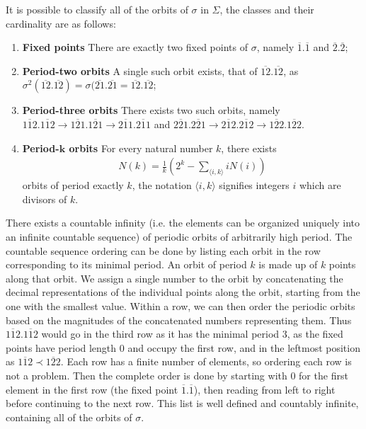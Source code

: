 It is possible to classify all of the orbits of $\sigma $ in $\Sigma$, the classes and their cardinality are as follows:
\begin{enumerate}
	\item \textbf{Fixed points} There are exactly two fixed points of $\sigma$, namely $\overline{1}\bm{.} \overline{1}$ and $\overline{2}\bm{.} \overline{2}$; 
	\item \textbf{Period-two orbits} A single such orbit exists, that of $\overline{12}\bm{.} \overline{12}$, as $\sigma^{2}(\overline{12}\bm{.} \overline{12}) = \sigma(\overline{21}\bm{.} \overline{21} = \overline{12}\bm{.} \overline{12}$;
	\item \textbf{Period-three orbits} There exists two such orbits, namely $\overline{112}\bm{.} \overline{112} \to \overline{121}\bm{.} \overline{121} \to \overline{211}\bm{.} \overline{211}$ and $\overline{221} \bm{.} \overline{221} \to \overline{212}\bm{.} \overline{212} \to \overline{122}\bm{.} \overline{122} $.
	\item \textbf{Period-$\bm{k} $ orbits} For every natural number $k$, there exists 
		\begin{align}
			\boxed{N(k) = \frac{1}{k}\left(2^k - \sum_{\langle i,k \rangle }^{} i N(i)\right)}		
		\end{align}
		orbits of period exactly $k$, the notation $\langle i,k\rangle$ signifies integers $i$ which are divisors of $k$.	
\end{enumerate}
There exists a countable infinity (i.e. the elements can be organized uniquely into an infinite countable sequence) of periodic orbits of arbitrarily high period. The countable sequence ordering can be done by listing each orbit in the row corresponding to its minimal period. An orbit of period $k$  is made up of $k$ points along that orbit. We assign a single number to the orbit by concatenating the decimal representations of the individual points along the orbit, starting from the one with the smallest value. Within a row, we can then order the periodic orbits based on the magnitudes of the concatenated numbers representing them. Thus $\overline{112}\bm{.} \overline{112}$ would go in the third row as it has the minimal period $3$, as the fixed points have period length $0$ and occupy the first row, and in the leftmost position as $\overline{112} \prec \overline{122}$. Each row has a finite number of elements, so ordering each row is not a problem. Then the complete order is done by starting with $0$ for the first element in the first row (the fixed point $\overline{1}\bm{.} \overline{1}$), then reading from left to right before continuing to the next row. This list is well defined and countably infinite, containing all of the orbits of $\sigma$.

